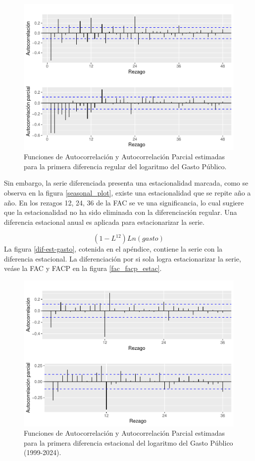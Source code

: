 \documentclass[
  12pt,
]{article}
\begin{document}
\begin{figure}[H]

{\centering \includegraphics[width=0.75\linewidth]{informe_files/figure-latex/unnamed-chunk-4-1} 

}

\caption{\label{fac_facp_diff} Funciones de Autocorrelación y Autocorrelación Parcial estimadas para la primera diferencia regular del logaritmo del Gasto Público.}\label{fig:unnamed-chunk-4}
\end{figure}

Sin embargo, la serie diferenciada presenta una estacionalidad marcada,
como se observa en la figura \ref{seasonal_plot}, existe una
estacionalidad que se repite año a año. En los rezagos 12, 24, 36 de la
FAC se ve una significancia, lo cual sugiere que la estacionalidad no ha
sido eliminada con la diferenciación regular. Una diferencia estacional
anual es aplicada para estacionarizar la serie.

\[(1-L^{12}) Ln(gasto)\] La figura \ref{dif-est-gasto}, cotenida en el
apéndice, contiene la serie con la diferencia estacional. La
diferenciación por si sola logra estacionarizar la serie, veáse la FAC y
FACP en la figura \ref{fac_facp_estac}.

\begin{figure}[H]

{\centering \includegraphics[width=0.75\linewidth]{informe_files/figure-latex/unnamed-chunk-5-1} 

}

\caption{\label{fac_facp_estac} Funciones de Autocorrelación y Autocorrelación Parcial estimadas para la primera diferencia estacional del logaritmo del Gasto Público (1999-2024).}\label{fig:unnamed-chunk-5}
\end{figure}
\end{document}
